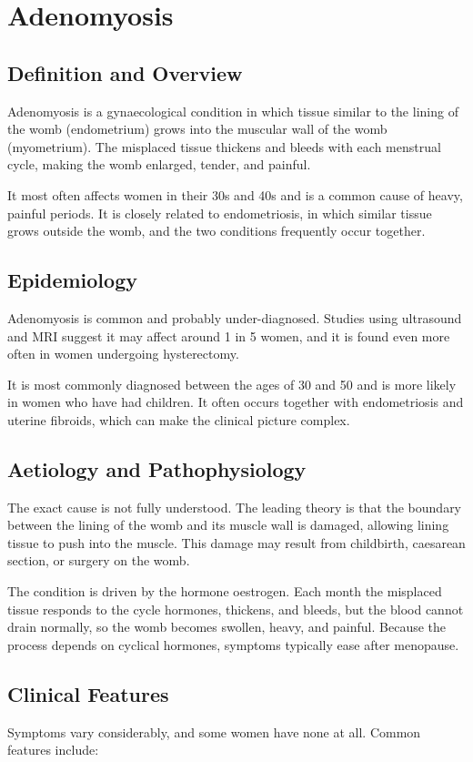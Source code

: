 \chapter{Adenomyosis}

\section*{Definition and Overview}
Adenomyosis is a gynaecological condition in which tissue similar to the lining of the womb (endometrium) grows into the muscular wall of the womb (myometrium). The misplaced tissue thickens and bleeds with each menstrual cycle, making the womb enlarged, tender, and painful.

It most often affects women in their 30s and 40s and is a common cause of heavy, painful periods. It is closely related to endometriosis, in which similar tissue grows outside the womb, and the two conditions frequently occur together.

\section*{Epidemiology}
Adenomyosis is common and probably under-diagnosed. Studies using ultrasound and MRI suggest it may affect around 1 in 5 women, and it is found even more often in women undergoing hysterectomy.

It is most commonly diagnosed between the ages of 30 and 50 and is more likely in women who have had children. It often occurs together with endometriosis and uterine fibroids, which can make the clinical picture complex.

\section*{Aetiology and Pathophysiology}
The exact cause is not fully understood. The leading theory is that the boundary between the lining of the womb and its muscle wall is damaged, allowing lining tissue to push into the muscle. This damage may result from childbirth, caesarean section, or surgery on the womb.

The condition is driven by the hormone oestrogen. Each month the misplaced tissue responds to the cycle hormones, thickens, and bleeds, but the blood cannot drain normally, so the womb becomes swollen, heavy, and painful. Because the process depends on cyclical hormones, symptoms typically ease after menopause.

\section*{Clinical Features}
Symptoms vary considerably, and some women have none at all. Common features include:

